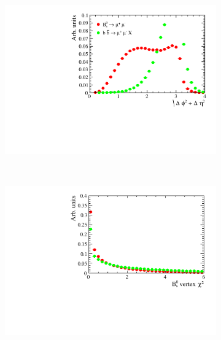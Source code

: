 \begin{figure}
    \centering
    \begin{subfigure}[b]{0.4\textwidth}
        \includegraphics[width=\textwidth]{./Figs/Selection/var1_sim_all.pdf}
        \caption{ }
        \label{fig:}
    \end{subfigure}
    ~ %
    \begin{subfigure}[b]{0.4\textwidth}
       \includegraphics[width=\textwidth]{./Figs/Selection/var2_sim_all.pdf}
        \caption{ }
        \label{fig:}
    \end{subfigure}


\end{figure}
